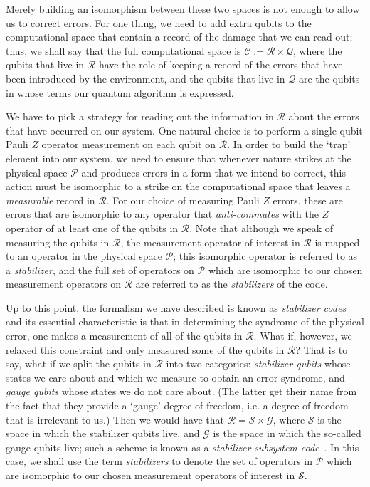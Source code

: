 \documentclass[twocolumn,showpacs,preprintnumbers,amsmath,amssymb,nofootinbib,pra,floatfix]{revtex4-1}
\begin{document}
Merely building an isomorphism between these two spaces is not enough to allow us to correct errors.  For one thing, we need to add extra qubits to the computational space that contain a record of the damage that we can read out; thus, we shall say that the full computational space is $\mathscr{C}:=\mathscr{R}\times\mathscr{Q}$, where the qubits that live in $\mathscr{R}$ have the role of keeping a
record of the errors that have been introduced by the environment, and the qubits that live in $\mathscr{Q}$ are the qubits in whose terms our quantum
algorithm is expressed.  

We have to pick a strategy for reading out the information in $\mathscr{R}$ about the errors that have occurred on our system.  One natural choice is to perform a single-qubit Pauli $Z$ operator measurement on each qubit on $\mathscr{R}$.  In order to build the `trap' element into our system, we need to ensure that whenever nature strikes at the physical space $\mathscr{P}$ and produces errors in a form that we intend to correct, this action must be isomorphic to a strike on the computational space that leaves a \emph{measurable} record in $\mathscr{R}$.  For our choice of measuring Pauli $Z$ errors, these are errors that are isomorphic to any operator that \emph{anti-commutes} with the $Z$ operator of at least one of the qubits in $\mathscr{R}$.  Note that although we speak of measuring the qubits in $\mathscr{R}$, the measurement operator of interest in $\mathscr{R}$ is mapped to an operator in the physical space $\mathscr{P}$; this isomorphic operator is referred to as a \emph{stabilizer}, and the full set of operators on $\mathscr{P}$ which are isomorphic to our chosen measurement operators on $\mathscr{R}$ are referred to as the \emph{stabilizers} of the code.

Up to this point, the formalism we have described is known as \emph{stabilizer codes}~\cite{Gottesman:96a,Gottesman:97a,Calderbank:97a,Calderbank:97b} and its essential characteristic is that in determining the syndrome of the physical error, one makes a measurement of all of the qubits in $\mathscr{R}$. What if, however, we relaxed this constraint and only measured some of the qubits in $\mathscr{R}$?  That is to say, what if we split the qubits in $\mathscr{R}$ into two categories: \emph{stabilizer
qubits} whose states we care about and which we measure to obtain an error syndrome, and \emph{gauge
qubits} whose states we do not care about.  (The latter get their name
from the fact that they provide a `gauge' degree of freedom, i.e. a
degree of freedom that is irrelevant to us.)  Then we would have that
$\mathscr{R}=\mathscr{S}\times \mathscr{G}$, where $\mathscr{S}$ is
the space in which the stabilizer qubits live, and $\mathscr{G}$ is
the space in which the so-called gauge qubits live; such a scheme is
known as a \emph{stabilizer subsystem code}~\cite{Poulin:05a}.  In this case, we shall use the term
\emph{stabilizers} to denote the set of operators in $\mathscr{P}$ which are isomorphic to our chosen measurement operators of interest in $\mathscr{S}$.
\end{document}
